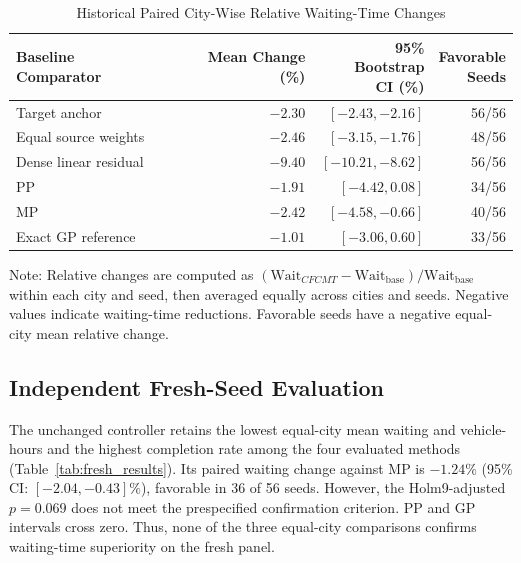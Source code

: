 \documentclass[letterpaper,journal]{IEEEtran}
\newcommand{\method}{CFCMT}
\begin{document}
\begin{table}[!t]
\centering
\caption{Historical Paired City-Wise Relative Waiting-Time Changes}
\label{tab:paired_effects}
\setlength{\tabcolsep}{2.5pt}
\begin{tabular}{@{}lrrr@{}}
\toprule
Baseline Comparator & Mean Change (\%) & \shortstack[r]{95\% Bootstrap\\CI (\%)} & \shortstack[r]{Favorable\\Seeds}\\
\midrule
Target anchor & $-2.30$ & $[-2.43,-2.16]$ & 56/56\\
Equal source weights & $-2.46$ & $[-3.15,-1.76]$ & 48/56\\
Dense linear residual & $-9.40$ & $[-10.21,-8.62]$ & 56/56\\
PP & $-1.91$ & $[-4.42,0.08]$ & 34/56\\
MP & $-2.42$ & $[-4.58,-0.66]$ & 40/56\\
Exact GP reference & $-1.01$ & $[-3.06,0.60]$ & 33/56\\
\bottomrule
\end{tabular}
\vspace{3pt}
\begin{minipage}{\columnwidth}\footnotesize
Note: Relative changes are computed as $(\text{Wait}_{\method}-\text{Wait}_{\mathrm{base}})/\text{Wait}_{\mathrm{base}}$ within each city and seed, then averaged equally across cities and seeds. Negative values indicate waiting-time reductions. Favorable seeds have a negative equal-city mean relative change.
\end{minipage}
\end{table}

\subsection{Independent Fresh-Seed Evaluation}
The unchanged controller retains the lowest equal-city mean waiting and vehicle-hours and the highest completion rate among the four evaluated methods (Table~\ref{tab:fresh_results}). Its paired waiting change against MP is $-1.24\%$ (95\% CI: $[-2.04,-0.43]\%$), favorable in 36 of 56 seeds. However, the Holm9-adjusted $p=0.069$ does not meet the prespecified confirmation criterion. PP and GP intervals cross zero. Thus, none of the three equal-city comparisons confirms waiting-time superiority on the fresh panel.
\end{document}
